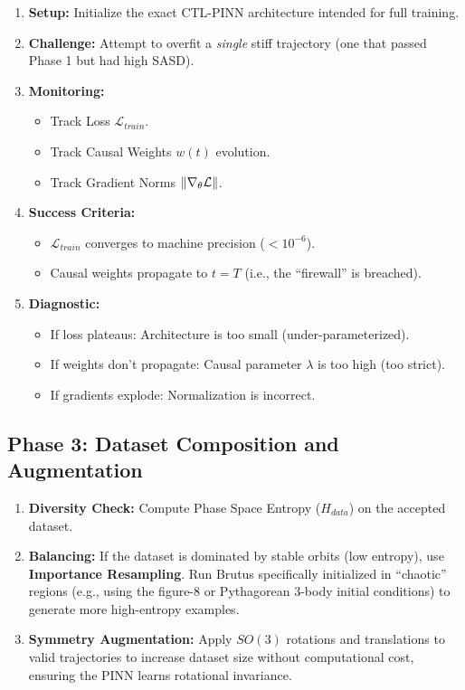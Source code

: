 \begin{enumerate}
    \item \textbf{Setup:} Initialize the exact CTL-PINN architecture intended for full training.
    \item \textbf{Challenge:} Attempt to overfit a \textit{single} stiff trajectory (one that passed Phase 1 but had high SASD).
    \item \textbf{Monitoring:}
    \begin{itemize}
        \item Track Loss $\mathcal{L}_{train}$.
        \item Track Causal Weights $w(t)$ evolution.
        \item Track Gradient Norms $\left\lVert\nabla_\theta \mathcal{L}\right\rVert$.
    \end{itemize}
    \item \textbf{Success Criteria:}
    \begin{itemize}
        \item $\mathcal{L}_{train}$ converges to machine precision ($< 10^{-6}$).
        \item Causal weights propagate to $t=T$ (i.e., the ``firewall'' is breached).
    \end{itemize}
    \item \textbf{Diagnostic:}
    \begin{itemize}
        \item If loss plateaus: Architecture is too small (under-parameterized).
        \item If weights don't propagate: Causal parameter $\lambda$ is too high (too strict).
        \item If gradients explode: Normalization is incorrect.
    \end{itemize}
\end{enumerate}

\subsection{Phase 3: Dataset Composition and Augmentation}

\begin{enumerate}
    \item \textbf{Diversity Check:} Compute Phase Space Entropy ($H_{data}$) on the accepted dataset.
    \item \textbf{Balancing:} If the dataset is dominated by stable orbits (low entropy), use \textbf{Importance Resampling}. Run Brutus specifically initialized in ``chaotic'' regions (e.g., using the figure-8 or Pythagorean 3-body initial conditions) to generate more high-entropy examples.
    \item \textbf{Symmetry Augmentation:} Apply $SO(3)$ rotations and translations to valid trajectories to increase dataset size without computational cost, ensuring the PINN learns rotational invariance.
\end{enumerate}
